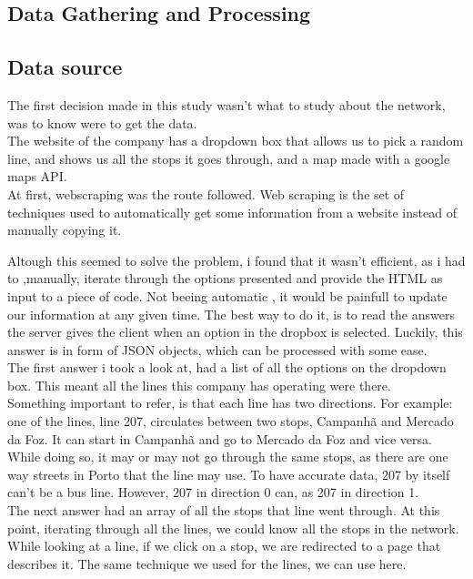 \documentclass[12pt]{article}
\begin{document}
\begin{multicols}{2}
\section{Data Gathering and Processing}

\subsection{Data source}
The first decision made in this study wasn't what to study about the network, was to know were to get the data. \\
	The website of the company has a dropdown box that allows us to pick a random line, and shows us all the stops it goes through, and a map made with a google maps API.\\
At first, webscraping was the route followed. Web scraping \cite{vargiu2012exploiting} is  the set of techniques used to automatically get some information from a website instead of manually copying it.

 Altough this seemed to solve the problem, i found that it wasn't efficient, as i had to ,manually, iterate through the options presented and provide the HTML as input to a piece of code. Not beeing automatic , it would be painfull to update our information at any given time.
The best way to do it, is to read the answers the server gives the client when an option in the dropbox is selected. Luckily, this answer is in form of JSON objects, which can be processed with some ease.\\
The first answer i took a look at, had a list of all the options on the dropdown box. This meant all the lines this company has operating were there.\\
Something important to refer, is that each line has two directions. For example: one of the lines, line 207, circulates between two stops, Campanhã and Mercado da Foz. It can start in Campanhã and go to Mercado da Foz and vice versa. While doing so, it may or may not go through the same stops, as there are one way streets in Porto that the line may use. To have accurate data, 207 by itself can't be a bus line. However, 207 in direction 0 can, as 207 in direction 1.\\
The next answer had an array of all the stops that line went through. At this point, iterating through all the lines, we could know all the stops in the network.\\
While looking at a line, if we click on a stop, we are redirected to a page that describes it. The same technique we used for the lines, we can use here. \\


\end{multicols}
\end{document}
